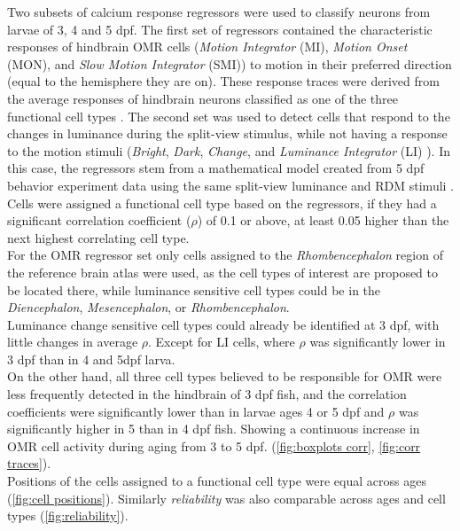 \documentclass[12pt, a4paper, oneside]{article}
\begin{document}
Two subsets of calcium response regressors were used to classify neurons from larvae of 3, 4 and 5 dpf.
The first set of regressors contained the characteristic responses of hindbrain OMR cells (\textit{Motion Integrator} (MI), \textit{Motion Onset} (MON), and \textit{Slow Motion Integrator} (SMI)) to motion in their preferred direction (equal to the hemisphere they are on). These response traces were derived from the average responses of hindbrain neurons classified as one of the three functional cell types \parencite{boulanger-weillCorrelativeLightElectron2025}.
The second set was used to detect cells that respond to the changes in luminance during the split-view stimulus, while not having a response to the motion stimuli (\textit{Bright}, \textit{Dark}, \textit{Change}, and \textit{Luminance Integrator} (LI) ). In this case, the regressors stem from a mathematical model created from 5 dpf behavior experiment data using the same split-view luminance and RDM stimuli \parencite{slangewalVisuomotorDecisionmakingMultifeature2026}.\\
Cells were assigned a functional cell type based on the regressors, if they had a significant correlation coefficient ($\rho$) of 0.1 or above, at least 0.05 higher than the next highest correlating cell type.\\
For the OMR regressor set only cells assigned to the \textit{Rhombencephalon} region of the  reference brain atlas were used, as the cell types of interest are proposed to be located there, while luminance sensitive cell types could be in the \textit{Diencephalon}, \textit{Mesencephalon}, or \textit{Rhombencephalon}.\\

Luminance change sensitive cell types could already be identified at 3 dpf, with little changes in average $\rho$. 
Except for LI cells, where $\rho$ was significantly lower in 3 dpf than in 4 and 5dpf larva.\\
On the other hand, all three cell types believed to be responsible for OMR were less frequently detected in the hindbrain of 3 dpf fish, and the correlation coefficients were significantly lower than in larvae ages 4 or 5 dpf and $\rho$ was significantly higher in 5 than in 4 dpf fish. Showing a continuous increase in OMR cell activity during aging from 3 to 5 dpf. (\autoref{fig:boxplots corr}, \autoref{fig:corr traces}).\\
Positions of the cells assigned to a functional cell type were equal across ages (\autoref{fig:cell positions}). Similarly \textit{reliability} was also comparable across ages and cell types (\autoref{fig:reliability}).\\
\end{document}
